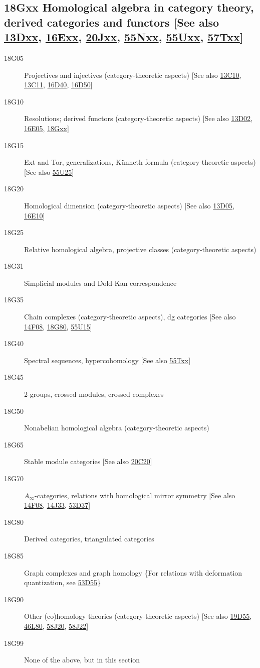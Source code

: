 \documentclass[letterpaper]{article}
\begin{document}
\subsection*{18Gxx  Homological algebra in category theory, derived categories and functors [See also \hyperref[13Dxx]{13Dxx}, \hyperref[16Exx]{16Exx}, \hyperref[20Jxx]{20Jxx}, \hyperref[55Nxx]{55Nxx}, \hyperref[55Uxx]{55Uxx}, \hyperref[57Txx]{57Txx}] }\label{18Gxx}
\begin{description}
\item [18G05]\label{18G05} Projectives and injectives (category-theoretic aspects) [See also \hyperref[13C10]{13C10}, \hyperref[13C11]{13C11}, \hyperref[16D40]{16D40}, \hyperref[16D50]{16D50}]
\item [18G10]\label{18G10} Resolutions; derived functors (category-theoretic aspects) [See also \hyperref[13D02]{13D02}, \hyperref[16E05]{16E05}, \hyperref[18Gxx]{18Gxx}]
\item [18G15]\label{18G15} Ext and Tor, generalizations, K\"{u}nneth formula (category-theoretic aspects) [See also \hyperref[55U25]{55U25}]
\item [18G20]\label{18G20} Homological dimension (category-theoretic aspects) [See also \hyperref[13D05]{13D05}, \hyperref[16E10]{16E10}]
\item [18G25]\label{18G25} Relative homological algebra, projective classes (category-theoretic aspects)
\item [18G31]\label{18G31} Simplicial modules and Dold-Kan correspondence
\item [18G35]\label{18G35} Chain complexes (category-theoretic aspects), dg categories [See also \hyperref[14F08]{14F08}, \hyperref[18G80]{18G80}, \hyperref[55U15]{55U15}]
\item [18G40]\label{18G40} Spectral sequences, hypercohomology [See also \hyperref[55Txx]{55Txx}]
\item [18G45]\label{18G45} 2-groups, crossed modules, crossed complexes
\item [18G50]\label{18G50} Nonabelian homological algebra (category-theoretic aspects)
\item [18G65]\label{18G65} Stable module categories [See also \hyperref[20C20]{20C20}]
\item [18G70]\label{18G70} $A_{\infty}$-categories, relations with homological mirror symmetry [See also \hyperref[14F08]{14F08}, \hyperref[14J33]{14J33}, \hyperref[53D37]{53D37}]
\item [18G80]\label{18G80} Derived categories, triangulated categories
\item [18G85]\label{18G85} Graph complexes and graph homology \{For relations with deformation quantization, see \hyperref[53D55]{53D55}\}
\item [18G90]\label{18G90} Other (co)homology theories (category-theoretic aspects) [See also \hyperref[19D55]{19D55}, \hyperref[46L80]{46L80}, \hyperref[58J20]{58J20}, \hyperref[58J22]{58J22}]
\item [18G99]\label{18G99} None of the above, but in this section
\end{description}
\end{document}
